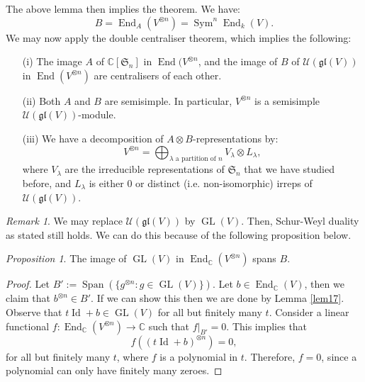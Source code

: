 \documentclass[a4paper]{report}
\theoremstyle{definition}
\theoremstyle{remark}
\newtheorem{remark}{Remark}
\theoremstyle{proposition}
\newtheorem{proposition}{Proposition}
\theoremstyle{conjecture}
\theoremstyle{lemma}
\theoremstyle{corollary}
\theoremstyle{exercise}
\theoremstyle{example}
\newcommand{\C}{\mathbb{C}}
\newcommand{\mcal}{\mathcal}
\newcommand{\on}{\operatorname}
\begin{document}
The above lemma then implies the theorem. We have:
$$B = \on{End}_A(V^{\otimes n}) = \on{Sym}^n\on{End}_k(V).$$
We may now apply the double centraliser theorem, which implies the following:

\begin{theorem}
    \leavevmode
    \begin{itemize}
        \item[(i)] The image $A$ of $\C[\mathfrak{S}_n]$ in 
            $\on{End}(V^{\otimes n}$, and the image of $B$ of 
            $\mcal{U}(\mathfrak{gl}(V))$ in $\on{End}(V^{\otimes n})$ 
            are centralisers of each other.
        \item[(ii)] Both $A$ and $B$ are semisimple. In particular, 
            $V^{\otimes n}$ is a semisimple $\mcal{U}(\mathfrak{gl}(V))$-module.
        \item[(iii)] We have a decomposition of $A\otimes B$-representations
            by: 
            $$V^{\otimes n} = \bigoplus_{\text{$\lambda$ a partition of $n$}}V_\lambda \otimes L_\lambda,$$
            where $V_\lambda$ are the irreducible representations of 
            $\mathfrak{S}_n$ that we have studied before, and 
            $L_\lambda$ is either $0$ or distinct (i.e. non-isomorphic)
            irreps of $\mcal{U}(\mathfrak{gl}(V))$.
    \end{itemize}
\end{theorem}

\begin{remark}
    We may replace $\mcal{U}(\mathfrak{gl}(V))$ by $\on{GL}(V)$.
    Then, Schur-Weyl duality as stated still holds. 
    We can do this because of the following proposition below.
\end{remark}

\begin{proposition}
    The image of $\on{GL}(V)$ in $\on{End}_\C(V^{\otimes n})$ spans $B$.
\end{proposition}

\begin{proof}
    Let $B' := \on{Span} (\lbrace g^{\otimes n} : g\in \on{GL}(V)\rbrace)$.
    Let $b \in \on{End}_\C(V)$, then we claim that $b^{\otimes n} \in B'$.
    If we can show this then we are done by Lemma \ref{lem17}.
    Observe that $t\on{Id} + b \in \on{GL}(V)$ for all but finitely many
    $t$. Consider a linear functional $f : \on{End}_\C(V^{\otimes n}) \to \C$ 
    such that $f\vert_{B'} = 0$. This implies that 
    $$f( (t\on{Id} + b)^{\otimes n}) = 0,$$
    for all but finitely many $t$, where $f$ is a polynomial in $t$. 
    Therefore, $f = 0$, since a polynomial can only have finitely many zeroes.
\end{proof}
\end{document}
